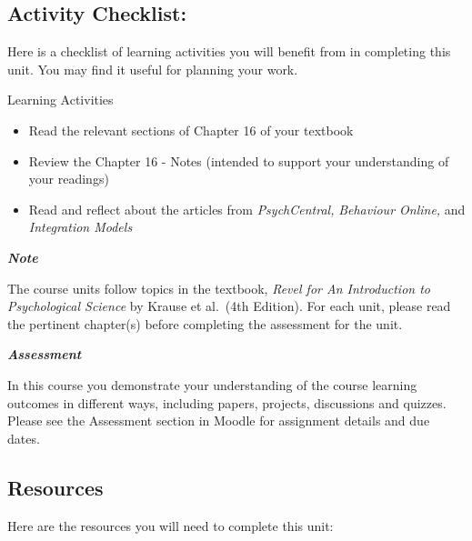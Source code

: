\documentclass[
]{book}
\providecommand{\tightlist}{%
  \setlength{\itemsep}{0pt}\setlength{\parskip}{0pt}}
\begin{document}
\hypertarget{activity-checklist-10}{%
\subsection*{Activity Checklist:}\label{activity-checklist-10}}

Here is a checklist of learning activities you will benefit from in completing this unit. You may find it useful for planning your work.

\begin{reflect}
{Learning Activities}

\begin{itemize}
\tightlist
\item
  Read the relevant sections of Chapter 16 of your textbook
\item
  Review the Chapter 16 - Notes (intended to support your understanding of your readings)
\item
  Read and reflect about the articles from \emph{PsychCentral,} \emph{Behaviour Online,} and \emph{Integration Models}
\end{itemize}
\end{reflect}

\begin{caution}
\textbf{\emph{Note}}

The course units follow topics in the textbook, \emph{Revel for An Introduction to Psychological Science} by Krause et al.~(4th Edition). For each unit, please read the pertinent chapter(s) before completing the assessment for the unit.
\end{caution}

\begin{assessment}
\textbf{\emph{Assessment}}

In this course you demonstrate your understanding of the course learning outcomes in different ways, including papers, projects, discussions and quizzes. Please see the Assessment section in Moodle for assignment details and due dates.
\end{assessment}

\hypertarget{resources-10}{%
\subsection*{Resources}\label{resources-10}}

Here are the resources you will need to complete this unit:
\end{document}
